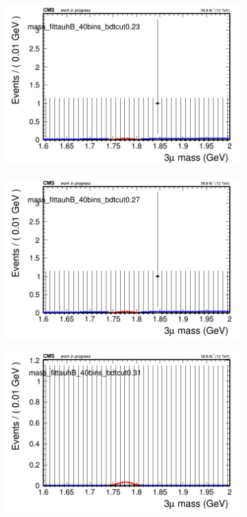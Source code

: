 \begin{figure}[H]
\begin{subfigure}{0.2\textwidth}
        \includegraphics[width=\textwidth]{unfixed_exp/plots/tauhB/massfit_tauhB_40bins_bdtcut0.23.png}
        \caption{}
    \end{subfigure}
    \begin{subfigure}{0.2\textwidth}
        \includegraphics[width=\textwidth]{unfixed_exp/plots/tauhB/massfit_tauhB_40bins_bdtcut0.27.png}
        \caption{}
    \end{subfigure}
    \begin{subfigure}{0.2\textwidth}
        \includegraphics[width=\textwidth]{unfixed_exp/plots/tauhB/massfit_tauhB_40bins_bdtcut0.31.png}

\end{subfigure}
\end{figure}
